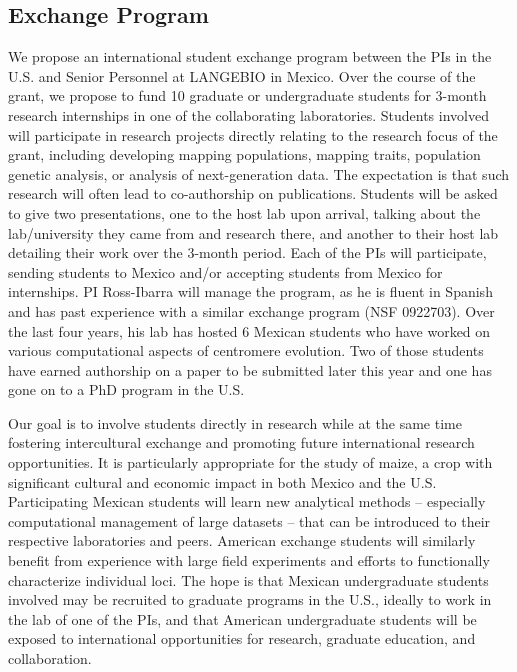 

\subsection*{Exchange Program} 

We propose an international student exchange program between the PIs in the U.S. and Senior Personnel at LANGEBIO in Mexico. Over the course of the grant, we propose to fund 10 graduate or undergraduate students for 3-month research internships in one of the collaborating laboratories. Students involved will participate in research projects directly relating to the research focus of the grant, including developing mapping populations, mapping traits, population genetic analysis, or analysis of next-generation data. The expectation is that such research will often lead to co-authorship on publications. Students will be asked to give two presentations, one to the host lab upon arrival, talking about the lab/university they came from and research there, and another to their host lab detailing their work over the 3-month period.  Each of the PIs will participate, sending students to Mexico and/or accepting students from Mexico for internships. PI Ross-Ibarra will manage the program, as he is fluent in Spanish and has past experience with a similar exchange program (NSF 0922703). Over the last four years, his lab has hosted 6 Mexican students who have worked on various computational aspects of centromere evolution. Two of those students have earned authorship on a paper to be submitted later this year and one has gone on to a PhD program in the U.S.

Our goal is to involve students directly in research while at the same time fostering intercultural exchange and promoting future international research opportunities. It is particularly appropriate for the study of maize, a crop with significant cultural and economic impact in both Mexico and the U.S. Participating Mexican students will learn new analytical methods -- especially computational management of large datasets -- that can be introduced to their respective laboratories and peers. American exchange students will similarly benefit from experience with large field experiments and efforts to functionally characterize individual loci.  The hope is that Mexican undergraduate students involved may be recruited to graduate programs in the U.S., ideally to work in the lab of one of the PIs, and that American undergraduate students will be exposed to international opportunities for research, graduate education, and collaboration.


